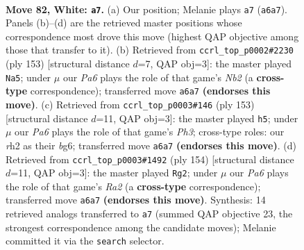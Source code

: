 \documentclass[11pt]{article}
\begin{document}
\clearpage

\begin{figure}[p]\centering
\begin{subfigure}{0.46\textwidth}\centering
\resizebox{\linewidth}{!}{%
\newchessgame
\chessboard[
  setfen={6k1/8/PP5n/8/8/K7/7r/4R3 w - - 3 82},
  showmover=false,
  pgfstyle=straightmove, color=movearrow, markmove={a6-a7}
]}
\caption{}
\end{subfigure}\hfill
\begin{subfigure}{0.46\textwidth}\centering
\resizebox{\linewidth}{!}{%
\newchessgame
\chessboard[
  setfen={8/1n1k4/8/8/8/K7/6r1/1NR5 b - - 8 77},
  showmover=false,
  pgfstyle=straightmove, color=movearrow, markmove={b7-a5}
]}
\caption{}
\end{subfigure}
\\[4pt]
\begin{subfigure}{0.46\textwidth}\centering
\resizebox{\linewidth}{!}{%
\newchessgame
\chessboard[
  setfen={8/4r3/6Bp/8/3K2k1/1N6/8/8 b - - 2 77},
  showmover=false,
  pgfstyle=straightmove, color=movearrow, markmove={h6-h5}
]}
\caption{}
\end{subfigure}\hfill
\begin{subfigure}{0.46\textwidth}\centering
\resizebox{\linewidth}{!}{%
\newchessgame
\chessboard[
  setfen={8/4R3/2k5/8/3n3r/6K1/R7/8 w - - 1 78},
  showmover=false,
  pgfstyle=straightmove, color=movearrow, markmove={a2-g2}
]}
\caption{}
\end{subfigure}
\caption{\textbf{Move 82, White: \texttt{a7}.} (a) Our position; Melanie plays \texttt{a7} (\texttt{a6a7}). Panels (b)--(d) are the retrieved master positions whose correspondence most drove this move (highest QAP objective among those that transfer to it). (b) Retrieved from \texttt{ccrl\_top\_p0002\#2230} (ply 153) [structural distance $d$=7, QAP obj=3]: the master played \texttt{Na5}; under $\mu$ our \emph{Pa6} plays the role of that game's \emph{Nb2} (a \textbf{cross-type} correspondence); transferred move \texttt{a6a7} \textbf{(endorses this move)}. (c) Retrieved from \texttt{ccrl\_top\_p0003\#146} (ply 153) [structural distance $d$=11, QAP obj=3]: the master played \texttt{h5}; under $\mu$ our \emph{Pa6} plays the role of that game's \emph{Ph3}; cross-type roles: our \emph{r}h2 as their \emph{b}g6; transferred move \texttt{a6a7} \textbf{(endorses this move)}. (d) Retrieved from \texttt{ccrl\_top\_p0003\#1492} (ply 154) [structural distance $d$=11, QAP obj=3]: the master played \texttt{Rg2}; under $\mu$ our \emph{Pa6} plays the role of that game's \emph{Ra2} (a \textbf{cross-type} correspondence); transferred move \texttt{a6a7} \textbf{(endorses this move)}. Synthesis: 14 retrieved analogs transferred to \texttt{a7} (summed QAP objective 23, the strongest correspondence among the candidate moves); Melanie committed it via the \texttt{search} selector.}
\label{fig:thought-m162}
\end{figure}
\end{document}
